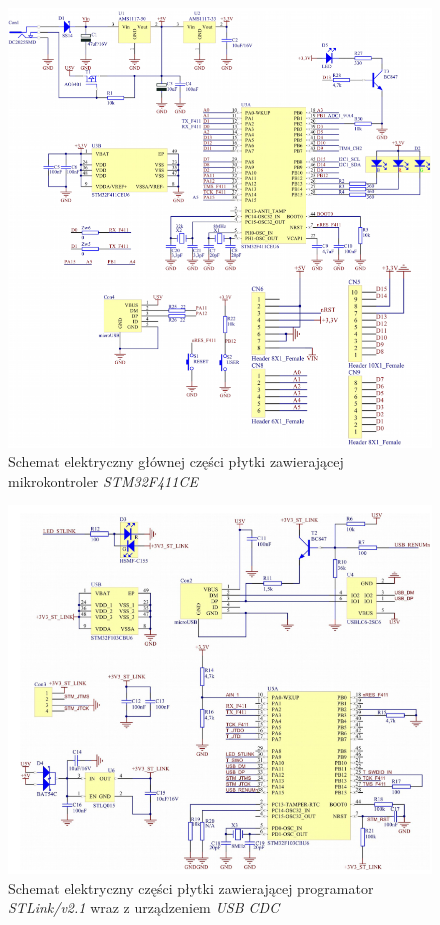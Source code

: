 \begin{figure}[h!]
    \centering 
    \includegraphics[scale=0.5]{pl/media/f411_main.png}
    \caption{Schemat elektryczny głównej części płytki \cite{NUCLEO} zawierającej mikrokontroler \textit{STM32F411CE}}
    \label{fig:f411_main}
\end{figure}

\begin{figure}[h!]
    \centering 
    \includegraphics[scale=0.5]{pl/media/f411_stlink.png}
    \caption{Schemat elektryczny części płytki \cite{NUCLEO} zawierającej programator \textit{STLink/v2.1} 
    wraz z urządzeniem \textit{USB CDC}}
    \label{fig:f411_stlink}
\end{figure}

